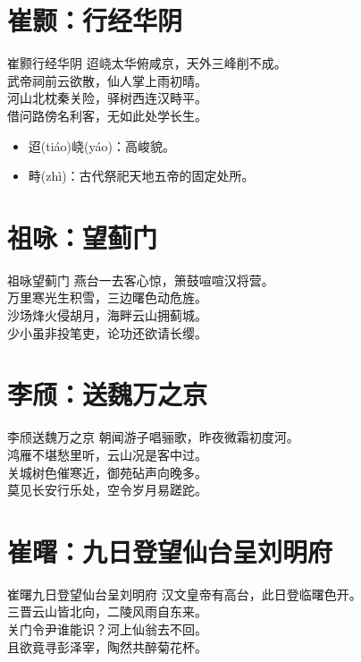 \documentclass[12pt,oneside,a5paper]{book}
\begin{document}
\chapter{崔颢：行经华阴}
\begin{poemzh}{崔颢}{行经华阴}
迢峣太华俯咸京，天外三峰削不成。\\
武帝祠前云欲散，仙人掌上雨初晴。\\
河山北枕秦关险，驿树西连汉畤平。\\
借问路傍名利客，无如此处学长生。\\ 
\end{poemzh}

\begin{itemize}
\item 迢(tiáo)峣(yáo)：高峻貌。
\item 畤(zhì)：古代祭祀天地五帝的固定处所。
\end{itemize}

\chapter{祖咏：望蓟门}
\begin{poemzh}{祖咏}{望蓟门}
燕台一去客心惊，箫鼓喧喧汉将营。\\
万里寒光生积雪，三边曙色动危旌。\\
沙场烽火侵胡月，海畔云山拥蓟城。\\
少小虽非投笔吏，论功还欲请长缨。\\ 
\end{poemzh}

\chapter{李颀：送魏万之京}
\begin{poemzh}{李颀}{送魏万之京}
朝闻游子唱骊歌，昨夜微霜初度河。\\
鸿雁不堪愁里听，云山况是客中过。\\
关城树色催寒近，御苑砧声向晚多。\\
莫见长安行乐处，空令岁月易蹉跎。\\ 
\end{poemzh}

\chapter{崔曙：九日登望仙台呈刘明府}
\begin{poemzh}{崔曙}{九日登望仙台呈刘明府}
汉文皇帝有高台，此日登临曙色开。\\
三晋云山皆北向，二陵风雨自东来。\\
关门令尹谁能识？河上仙翁去不回。\\
且欲竟寻彭泽宰，陶然共醉菊花杯。\\ 
\end{poemzh}
\end{document}
